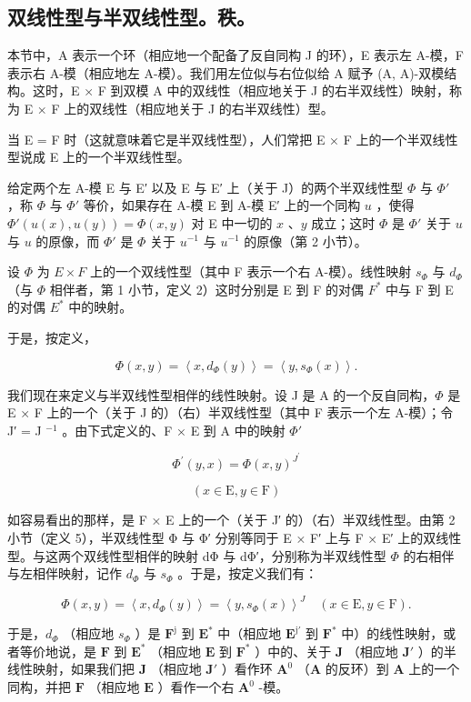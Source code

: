 \subsection{双线性型与半双线性型。秩。}

本节中，A 表示一个环（相应地一个配备了反自同构 J 的环），E 表示左 A-模，F 表示右 A-模（相应地左 A-模）。我们用左位似与右位似给 A 赋予 (A, A)-双模结构。这时，E × F 到双模 A 中的双线性（相应地关于 J 的右半双线性）映射，称为 E × F 上的双线性（相应地关于 J 的右半双线性）型。

当 E = F 时（这就意味着它是半双线性型），人们常把 E × F 上的一个半双线性型说成 E 上的一个半双线性型。

给定两个左 A-模 E 与 E′ 以及 E 与 E′ 上（关于 J）的两个半双线性型 \(\Phi\) 与 \(\Phi'\) ，称 \(\Phi\) 与 \(\Phi'\) 等价，如果存在 A-模 E 到 A-模 E′ 上的一个同构 \(u\) ，使得 \(\Phi'(u(x), u(y)) = \Phi(x, y)\) 对 E 中一切的 \(x\) 、\(y\) 成立；这时 \(\Phi\) 是 \(\Phi'\) 关于 \(u\) 与 \(u\) 的原像，而 \(\Phi'\) 是 \(\Phi\) 关于 \(u^{-1}\) 与 \(u^{-1}\) 的原像（第 2 小节）。

设 \(\Phi\) 为 \(E \times F\) 上的一个双线性型（其中 F 表示一个右 A-模）。线性映射 \(s_{\Phi}\) 与 \(d_{\Phi}\) （与 \(\Phi\) 相伴者，第 1 小节，定义 2）这时分别是 E 到 F 的对偶 \(F^{*}\) 中与 F 到 E 的对偶 \(E^{*}\) 中的映射。

于是，按定义，

\[
\Phi (x, y) = \left\langle x, d _ {\Phi} (y) \right\rangle = \left\langle y, s _ {\Phi} (x) \right\rangle .\tag{23}
\]

我们现在来定义与半双线性型相伴的线性映射。设 J 是 A 的一个反自同构，\(\Phi\) 是 E × F 上的一个（关于 J 的）（右）半双线性型（其中 F 表示一个左 A-模）；令 J′ = J \(^{-1}\) 。由下式定义的、F × E 到 A 中的映射 \(\Phi'\)

\[
\Phi^ {\prime} (y, x) = \Phi (x, y) ^ {J ^ {\prime}}
\]

\[
(x \in \mathrm{E}, y \in \mathrm{F})
\]

如容易看出的那样，是 F × E 上的一个（关于 J′ 的）（右）半双线性型。由第 2 小节（定义 5），半双线性型 Φ 与 Φ′ 分别等同于 E × F′ 上与 F × E′ 上的双线性型。与这两个双线性型相伴的映射 dΦ 与 dΦ′，分别称为半双线性型 \(\Phi\) 的右相伴与左相伴映射，记作 \(d_{\Phi}\) 与 \(s_{\Phi}\) 。于是，按定义我们有：

\[
\Phi (x, y) = \left\langle x, d _ {\Phi} (y) \right\rangle = \left\langle y, s _ {\Phi} (x) \right\rangle^ {J} \quad (x \in \mathrm{E}, y \in \mathrm{F}).\tag{24}
\]

于是，\(d_{\Phi}\) （相应地 \(s_{\Phi}\) ）是 \(\mathbf{F}^{\mathrm{j}}\) 到 \(\mathbf{E}^{*}\) 中（相应地 \(\mathbf{E}^{\mathrm{j}'}\) 到 \(\mathbf{F}^{*}\) 中）的线性映射，或者等价地说，是 \(\mathbf{F}\) 到 \(\mathbf{E}^{*}\) （相应地 \(\mathbf{E}\) 到 \(\mathbf{F}^{*}\) ）中的、关于 \(\mathbf{J}\) （相应地 \(\mathbf{J}'\) ）的半线性映射，如果我们把 \(\mathbf{J}\) （相应地 \(\mathbf{J}'\) ）看作环 \(\mathbf{A}^{0}\) （\(\mathbf{A}\) 的反环）到 \(\mathbf{A}\) 上的一个同构，并把 \(\mathbf{F}\) （相应地 \(\mathbf{E}\) ）看作一个右 \(\mathbf{A}^{0}\) -模。

